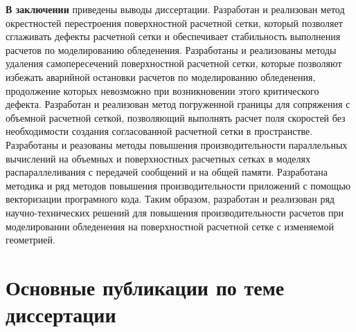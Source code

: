 \documentclass[a4paper,14pt]{extarticle}                     %
\theoremstyle{plain}                                         %
\begin{document}

\textbf{В заключении} приведены выводы диссертации.
Разработан и реализован метод окрестностей перестроения поверхностной расчетной сетки, который позволяет сглаживать дефекты расчетной сетки и обеспечивает стабильность выполнения расчетов по моделированию обледенения.
Разработаны и реализованы методы удаления самопересечений поверхностной расчетной сетки, которые позволяют избежать аварийной остановки расчетов по моделированию обледенения, продолжение которых невозможно при возникновении этого критического дефекта.
Разработан и реализован метод погруженной границы для сопряжения с объемной расчетной сеткой, позволяющий выполнять расчет поля скоростей без необходимости создания согласованной расчетной сетки в пространстве.
Разработаны и реазованы методы повышения производительности параллельных вычислений на объемных и поверхностных расчетных сетках в моделях распараллеливания с передачей сообщений и на общей памяти.
Разработана методика и ряд методов повышения производительности приложений с помощью векторизации програмного кода.
Таким образом, разработан и реализован ряд научно-технических решений для повышения производительности расчетов при моделировании обледенения на поверхностной расчетной сетке с изменяемой геометрией.

\section*{Основные публикации по теме диссертации}
\end{document}
